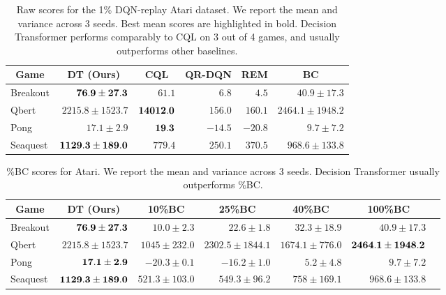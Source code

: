 \begin{table}[h]
\centering
\small
\begin{tabular}{lrrrrr}
\toprule
\multicolumn{1}{c}{\bf Game} & \multicolumn{1}{c}{\bf DT (Ours)} & \multicolumn{1}{c}{\bf CQL} & \multicolumn{1}{c}{\bf QR-DQN} & \multicolumn{1}{c}{\bf REM} & \multicolumn{1}{c}{\bf BC} \\
\midrule
Breakout  & $\bf{76.9} \pm 27.3$ & $61.1$ & $6.8$ & $4.5$& $40.9 \pm 17.3$ \\
Qbert     & $2215.8 \pm 1523.7$ & $\bf{14012.0}$ & $156.0$ & $160.1$ & $2464.1 \pm 1948.2$ \\
Pong      & $17.1 \pm 2.9$ & $\bf{19.3}$ & $-14.5$ & $-20.8$ & $9.7 \pm 7.2$ \\
Seaquest  & $\bf{1129.3} \pm 189.0$ & $779.4$ & $250.1$  & $370.5$   & $968.6 \pm 133.8$ \\
\bottomrule
\end{tabular}
\caption{
Raw scores for the 1\% DQN-replay Atari dataset.
We report the mean and variance across 3 seeds.
Best mean scores are highlighted in bold.
Decision Transformer performs comparably to CQL on 3 out of 4 games, and usually outperforms other baselines.}
\label{tbl:atari_main_raw}
\end{table}


\begin{table}[h]
\centering
\small
\begin{tabular}{lrrrrrr}
\toprule
\multicolumn{1}{c}{\bf Game} & \multicolumn{1}{c}{\bf DT (Ours)} & \multicolumn{1}{c}{\bf 10\%BC} & \multicolumn{1}{c}{\bf 25\%BC} & \multicolumn{1}{c}{\bf 40\%BC} & \multicolumn{1}{c}{\bf 100\%BC} \\
  \midrule
Breakout  & $\bf{76.9} \pm 27.3$ & $10.0 \pm 2.3$ & $22.6 \pm 1.8$ & $32.3 \pm 18.9$ &  $40.9 \pm 17.3$ \\
Qbert    & $2215.8 \pm 1523.7$ & $1045 \pm 232.0$ & $2302.5 \pm 1844.1$ & $1674.1 \pm 776.0$ & $\bf{2464.1} \pm 1948.2$ \\
Pong      & $\bf{17.1} \pm 2.9$ & $-20.3 \pm 0.1$ & $-16.2 \pm 1.0$ & $5.2 \pm 4.8$ & $9.7 \pm 7.2$ \\
Seaquest  & $\bf{1129.3} \pm 189.0$ & $521.3 \pm 103.0$ & $549.3 \pm 96.2$ & $758 \pm 169.1$ & $968.6 \pm 133.8$ \\
\bottomrule
\end{tabular}
\caption{\%BC scores for Atari. We report the mean and variance across 3 seeds.
Decision Transformer usually outperforms \%BC.}
\label{tbl:atari_percentile_bc_raw}
\end{table}